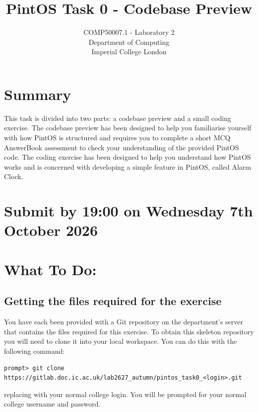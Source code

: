 \documentclass[a4paper,11pt]{article}
\begin{document}

\title{PintOS Task 0 - Codebase Preview}
\date{}

\author{
COMP50007.1 - Laboratory 2 \\
Department of Computing \\
Imperial College London
}

\maketitle

\section*{Summary}
This task is divided into two parts: a codebase preview and a small coding exercise.
The codebase preview has been designed to help you familiarise yourself with how PintOS is structured
and requires you to complete a short MCQ AnswerBook assessment to check your understanding of the provided PintOS code.
The coding exercise has been designed to help you understand how PintOS works
and is concerned with developing a simple feature in PintOS, called Alarm Clock.

\section*{Submit by 19:00 on Wednesday 7th October 2026}

\section*{What To Do:}

\subsection*{Getting the files required for the exercise}

You have each been provided with a Git repository on the department's  server that contains the files required for this exercise.
To obtain this skeleton repository you will need to clone it into your local workspace.
You can do this with the following command:
%
\begin{verbatim}
prompt> git clone https://gitlab.doc.ic.ac.uk/lab2627_autumn/pintos_task0_<login>.git
\end{verbatim}
%
replacing  with your normal college login.
You will be prompted for your normal college username and password.
\end{document}
